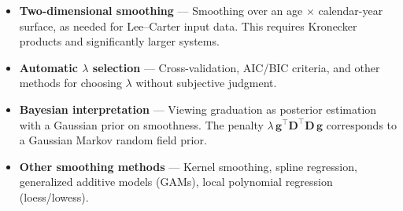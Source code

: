 \documentclass[11pt,a4paper]{article}
\begin{document}
\begin{itemize}[nosep]
  \item \textbf{Two-dimensional smoothing} --- Smoothing over an age $\times$ calendar-year surface, as needed for Lee--Carter input data.  This requires Kronecker products and significantly larger systems.
  \item \textbf{Automatic $\lambda$ selection} --- Cross-validation, AIC/BIC criteria, and other methods for choosing $\lambda$ without subjective judgment.
  \item \textbf{Bayesian interpretation} --- Viewing graduation as posterior estimation with a Gaussian prior on smoothness.  The penalty $\lambda\,\bm{g}^\top\bm{D}^\top\bm{D}\,\bm{g}$ corresponds to a Gaussian Markov random field prior.
  \item \textbf{Other smoothing methods} --- Kernel smoothing, spline regression, generalized additive models (GAMs), local polynomial regression (loess/lowess).
\end{itemize}
\end{document}
